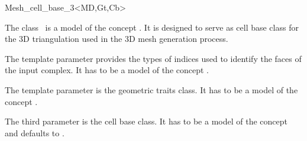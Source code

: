 \ccRefPageBegin


\begin{ccRefClass}{Mesh_cell_base_3<MD,Gt,Cb>}  %


\ccDefinition
  
The class \ccRefName\ is a model of the concept .
It is designed to serve as cell base class for the 3D triangulation 
used in the 3D mesh generation process.

\ccParameters

The  template parameter  provides the types of indices
used to identify 
the faces of the input complex. It has to be a model
of the concept .

The template parameter  is the geometric traits class.
It  has to be a model of the concept .

The third parameter  is the cell base class. It has to be a model
of the concept  and defaults to
.



\ccIsModel
{}

\ccInheritsFrom
{}


\ccSeeAlso

 \\




\end{ccRefClass}

\ccRefPageEnd

